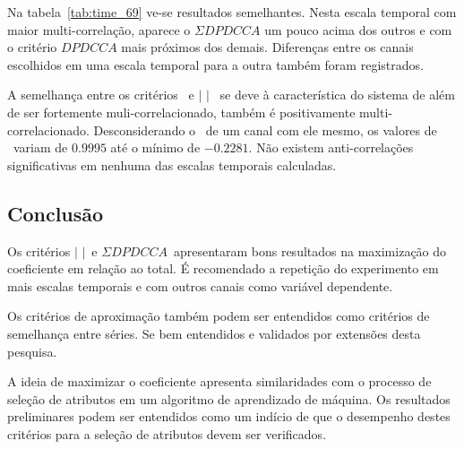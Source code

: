   Na tabela~\ref{tab:time_69} ve-se resultados semelhantes. Nesta escala temporal com maior multi-correlação, aparece o $\Sigma DPDCCA$ um pouco acima dos outros e com o critério $DPDCCA$ mais próximos dos demais. Diferenças entre os canais escolhidos em uma escala temporal para a outra também foram registrados.

  A semelhança entre os critérios \pdcca~e $|$ \pdcca $|$~ se deve à característica do sistema de além de ser fortemente muli-correlacionado, também é positivamente multi-correlacionado. Desconsiderando o \pdcca~de um canal com ele mesmo, os valores de \pdcca~variam de $0.9995$ até o mínimo de $-0.2281$. Não existem anti-correlações significativas em nenhuma das escalas temporais calculadas. 

\subsection{Conclusão}

Os critérios $|$ \pdcca $|$~e $\Sigma DPDCCA$~apresentaram bons resultados na maximização do coeficiente \dmc em relação ao total. É recomendado a repetição do experimento em mais escalas temporais e com outros canais como variável dependente.

Os critérios de aproximação também podem ser entendidos como critérios de semelhança entre séries. Se bem entendidos e validados por extensões desta pesquisa.

A ideia de maximizar o coeficiente apresenta similaridades com o processo de seleção de atributos em um algoritmo de aprendizado de máquina. Os resultados preliminares podem ser entendidos como um indício de que o desempenho destes critérios para a seleção de atributos devem ser verificados.